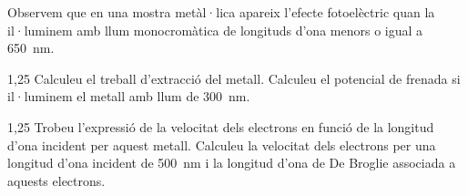 Observem que en una mostra metàl·lica apareix l'efecte fotoelèctric quan la il·luminem amb llum monocromàtica de longituds d'ona menors o igual a 650~nm.

\begin{apartat}{1,25}
Calculeu el treball d'extracció del metall. Calculeu el potencial de frenada si il·luminem el metall amb llum de 300~nm.
\end{apartat}

\begin{apartat}{1,25}
Trobeu l'expressió de la velocitat dels electrons en funció de la longitud d'ona incident per aquest metall. Calculeu la velocitat dels electrons per una longitud d'ona incident de 500~nm i la longitud d'ona de De Broglie associada a aquests electrons.
\end{apartat}

